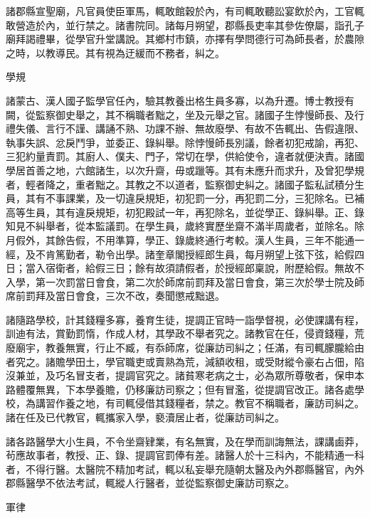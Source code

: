 \begin{pinyinscope}
 諸郡縣宣聖廟，凡官員使臣軍馬，輒敢館穀於內，有司輒敢聽訟宴飲於內，工官輒敢營造於內，並行禁之。諸書院同。諸每月朔望，郡縣長吏率其參佐僚屬，詣孔子廟拜謁禮畢，從學官升堂講說。其鄉村市鎮，亦擇有學問德行可為師長者，於農隙之時，以教導民。其有視為迂緩而不務者，糾之。



 學規



 諸蒙古、漢人國子監學官任內，驗其教養出格生員多寡，以為升遷。博士教授有闕，從監察御史舉之，其不稱職者黜之，坐及元舉之官。諸國子生悖慢師長、及行禮失儀、言行不謹、講誦不熟、功課不辦、無故廢學、有故不告輒出、告假違限、執事失誤、忿戾鬥爭，並委正、錄糾舉。除悖慢師長別議，餘者初犯戒諭，再犯、三犯約量責罰。其廚人、僕夫、門子，常切在學，供給使令，違者就便決責。諸國學居首善之地，六館諸生，以次升齋，毋或躐等。其有未應升而求升，及曾犯學規者，輕者降之，重者黜之。其教之不以道者，監察御史糾之。諸國子監私試積分生員，其有不事課業，及一切違戾規矩，初犯罰一分，再犯罰二分，三犯除名。已補高等生員，其有違戾規矩，初犯殿試一年，再犯除名，並從學正、錄糾舉。正、錄知見不糾舉者，從本監議罰。在學生員，歲終實歷坐齋不滿半周歲者，並除名。除月假外，其餘告假，不用準算，學正、錄歲終通行考較。漢人生員，三年不能通一經，及不肯篤勤者，勒令出學。諸奎章閣授經郎生員，每月朔望上弦下弦，給假四日；當入宿衛者，給假三日；餘有故須請假者，於授經郎稟說，附歷給假。無故不入學，第一次罰當日會食，第二次於師席前罰拜及當日會食，第三次於學士院及師席前罰拜及當日會食，三次不改，奏聞懲戒黜退。



 諸隨路學校，計其錢糧多寡，養育生徒，提調正官時一詣學督視，必使課講有程，訓迪有法，賞勤罰惰，作成人材，其學政不舉者究之。諸教官在任，侵資錢糧，荒廢廟宇，教養無實，行止不臧，有忝師席，從廉訪司糾之；任滿，有司輒朦朧給由者究之。諸贍學田土，學官職吏或賣熟為荒，減額收租，或受財縱令豪右占佃，陷沒兼並，及巧名冒支者，提調官究之。諸貧寒老病之士，必為眾所尊敬者，保申本路體覆無異，下本學養贍，仍移廉訪司察之；但有冒濫，從提調官改正。諸各處學校，為講習作養之地，有司輒侵借其錢糧者，禁之。教官不稱職者，廉訪司糾之。諸在任及已代教官，輒攜家入學，褻瀆居止者，從廉訪司糾之。



 諸各路醫學大小生員，不令坐齋肄業，有名無實，及在學而訓誨無法，課講鹵莽，茍應故事者，教授、正、錄、提調官罰俸有差。諸醫人於十三科內，不能精通一科者，不得行醫。太醫院不精加考試，輒以私妄舉充隨朝太醫及內外郡縣醫官，內外郡縣醫學不依法考試，輒縱人行醫者，並從監察御史廉訪司察之。



 軍律




\end{pinyinscope}
